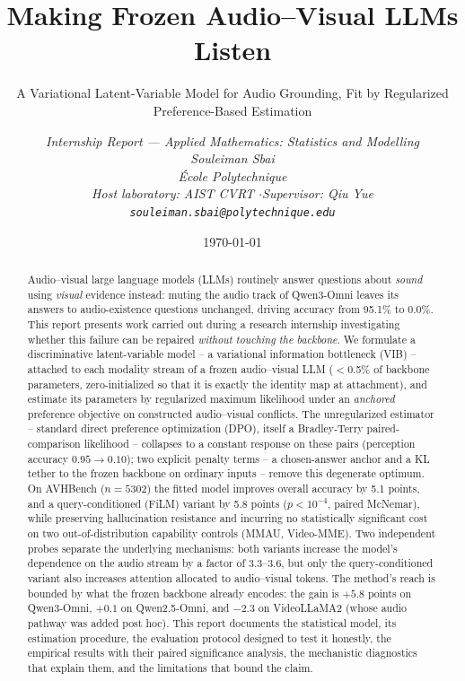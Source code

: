 \documentclass[11pt,a4paper,oneside]{article}
\title[Making Frozen Audio--Visual LLMs Listen]{Making Frozen Audio--Visual LLMs Listen}
\subtitle{A Variational Latent-Variable Model for Audio Grounding, Fit by Regularized
  Preference-Based Estimation}
\author{\itshape Internship Report --- Applied Mathematics: Statistics and Modelling\\[8pt]
  \upshape Souleiman Sbai\\[4pt]
  \'Ecole Polytechnique\\
  Host laboratory: AIST CVRT \quad$\cdot$\quad Supervisor: Qiu Yue\\
  \texttt{souleiman.sbai@polytechnique.edu}}
\date{\today}
\begin{document}
\maketitle

\begin{abstract}
\noindent
Audio--visual large language models (LLMs) routinely answer questions about \emph{sound} using
\emph{visual} evidence instead: muting the audio track of Qwen3-Omni leaves its answers to
audio-existence questions unchanged, driving accuracy from 95.1\% to 0.0\%. This report presents
work carried out during a research internship investigating whether this failure can be repaired
\emph{without touching the backbone}. We formulate a discriminative latent-variable model -- a
variational information bottleneck (VIB) -- attached to each modality stream of a frozen
audio--visual LLM ($<$0.5\% of backbone parameters, zero-initialized so that it is exactly the
identity map at attachment), and estimate its parameters by regularized maximum likelihood under an
\emph{anchored} preference objective on constructed audio--visual conflicts. The unregularized
estimator -- standard direct preference optimization (DPO), itself a Bradley-Terry paired-comparison
likelihood -- collapses to a constant response on these pairs (perception accuracy
$0.95\!\to\!0.10$); two explicit penalty terms -- a chosen-answer anchor and a KL tether to the
frozen backbone on ordinary inputs -- remove this degenerate optimum. On AVHBench ($n=5302$) the
fitted model improves overall accuracy by 5.1
points, and a query-conditioned (FiLM) variant by 5.8 points ($p<10^{-4}$, paired McNemar), while
preserving hallucination resistance and incurring no statistically significant cost on two
out-of-distribution capability controls (MMAU, Video-MME). Two independent probes separate the
underlying mechanisms: both variants increase the model's dependence on the audio stream by a factor
of 3.3--3.6, but only the query-conditioned variant also increases attention allocated to
audio--visual tokens. The method's reach is bounded by what the frozen backbone already encodes: the
gain is $+5.8$ points on Qwen3-Omni, $+0.1$ on Qwen2.5-Omni, and $-2.3$ on VideoLLaMA2 (whose audio
pathway was added post hoc). This report documents the statistical model, its estimation procedure,
the evaluation protocol designed to test it honestly, the empirical results with their paired
significance analysis, the mechanistic diagnostics that explain them, and the limitations that bound
the claim.
\end{abstract}
\end{document}
